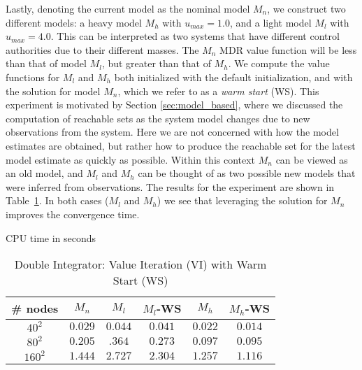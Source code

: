 Lastly, denoting the current model as the nominal model $M_n$, we construct two different models: a heavy model $M_h$ with $u_{max}=1.0$, and a light model $M_l$ with $u_{max}=4.0$. This can be interpreted as two systems that have different control authorities due to their different masses. The $M_n$ MDR value function will be less than that of model $M_l$, but greater than that of $M_h$. We compute the value functions for $M_l$ and $M_h$ both initialized with the default initialization, and with the solution for model $M_n$, which we refer to as a \emph{warm start} (WS). This experiment is motivated by Section \ref{sec:model_based}, where we discussed the computation of reachable sets as the system model changes due to new observations from the system. Here we are not concerned with how the model estimates are obtained, but rather how to produce the reachable set for the latest model estimate as quickly as possible. Within this context $M_n$ can be viewed as an old model, and $M_l$ and $M_h$ can be thought of as two possible new models that were inferred from observations. The results for the experiment are shown in Table~\ref{tab:ws_di}. In both cases ($M_l$ and $M_h$) we see that leveraging the solution for $M_n$ improves the convergence time.

\begin{table}
\centering
\caption{Double Integrator: Value Iteration (VI) with Warm Start (WS)} CPU time in seconds
\label{tab:ws_di}
\begin{tabular}{|c| c| c| c| c| c|}
\hline
\# nodes & $M_n$ & $M_l$ &  $M_l$-WS & $M_h$ & $M_h$-WS \\ \hline
$40^2$ & $0.029$ & $0.044$ & $0.041$ & $0.022$ & $0.014$\\ \hline
$80^2$ & $0.205$ & $.364$ & $0.273$ & $0.097$ & $0.095$\\ \hline
$160^2$ & $1.444$ & $2.727$ & $2.304$ & $1.257$ & $1.116$\\ \hline
\end{tabular}
\end{table}



